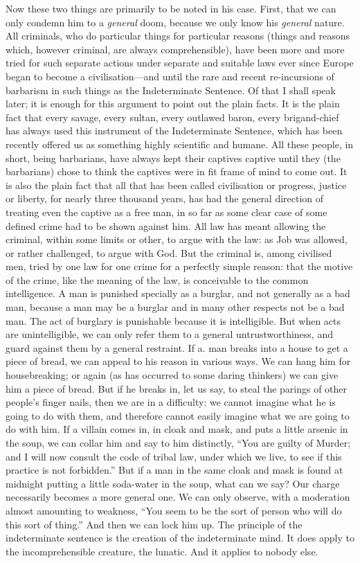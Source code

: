 \documentclass{book}
\begin{document}
Now these two things are primarily to be noted in his case. First, that we can only condemn him to a \emph{general} doom, because we only know his \emph{general} nature. All criminals, who do particular things for particular reasons (things and reasons which, however criminal, are always comprehensible), have been more and more tried for such separate actions under separate and suitable laws ever since Europe began to become a civilisation—and until the rare and recent re-incursions of barbarism in such things as the Indeterminate Sentence. Of that I shall speak later; it is enough for this argument to point out the plain facts. It is the plain fact that every savage, every sultan, every outlawed baron, every brigand-chief has always used this instrument of the Indeterminate Sentence, which has been recently offered us as something highly scientific and humane. All these people, in short, being barbarians, have always kept their captives captive until they (the barbarians) chose to think the captives were in fit frame of mind to come out. It is also the plain fact that all that has been called civilisation or progress, justice or liberty, for nearly three thousand years, has had the general direction of treating even the captive as a free man, in so far as some clear case of some defined crime had to be shown against him. All law has meant allowing the criminal, within some limits or other, to argue with the law: as Job was allowed, or rather challenged, to argue with God. But the criminal is, among civilised men, tried by one law for one crime for a perfectly simple reason: that the motive of the crime, like the meaning of the law, is conceivable to the common intelligence. A man is punished specially as a burglar, and not generally as a bad man, because a man may be a burglar and in many other respects not be a bad man. The act of burglary is punishable because it is intelligible. But when acts are unintelligible, we can only refer them to a general untrustworthiness, and guard against them by a general restraint. If a. man breaks into a house to get a piece of bread, we can appeal to his reason in various ways. We can hang him for housebreaking; or again (as has occurred to some daring thinkers) we can give him a piece of bread. But if he breaks in, let us say, to steal the parings of other people’s finger nails, then we are in a difficulty: we cannot imagine what he is going to do with them, and therefore cannot easily imagine what we are going to do with him. If a villain comes in, in cloak and mask, and puts a little arsenic in the soup, we can collar him and say to him distinctly, “You are guilty of Murder; and I will now consult the code of tribal law, under which we live, to see if this practice is not forbidden.” But if a man in the same cloak and mask is found at midnight putting a little soda-water in the soup, what can we say? Our charge necessarily becomes a more general one. We can only observe, with a moderation almost amounting to weakness, “You seem to be the sort of person who will do this sort of thing.” And then we can lock him up. The principle of the indeterminate sentence is the creation of the indeterminate mind. It does apply to the incomprehensible creature, the lunatic. And it applies to nobody else.
\end{document}
